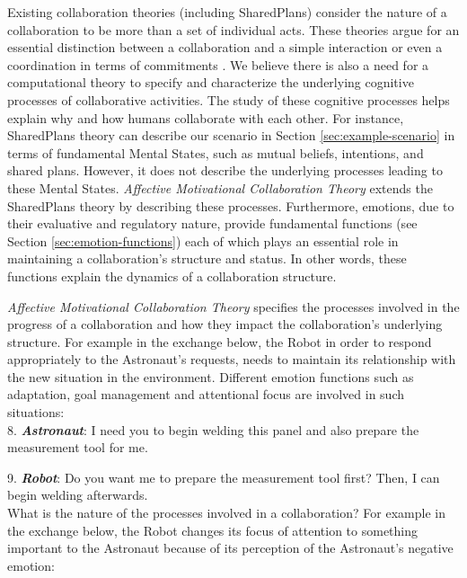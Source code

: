 \documentclass[12pt]{report}
\begin{document}
Existing collaboration theories (including SharedPlans) consider the nature of a
collaboration to be more than a set of individual acts. These theories argue for
an essential distinction between a collaboration and a simple interaction or
even a coordination in terms of commitments \cite{grosz:shared-plans,
lochbaum:collaborative-planning}. We believe there is also a need for a
computational theory to specify and characterize the underlying cognitive
processes of collaborative activities. The study of these cognitive processes
helps explain why and how humans collaborate with each other. For instance,
SharedPlans theory can describe our scenario in Section
\ref{sec:example-scenario} in terms of fundamental Mental States, such as mutual
beliefs, intentions, and shared plans. However, it does not describe the
underlying processes leading to these Mental States. \textit{Affective
Motivational Collaboration Theory} extends the SharedPlans theory by describing
these processes. Furthermore, emotions, due to their evaluative and regulatory
nature, provide fundamental functions (see Section \ref{sec:emotion-functions})
each of which plays an essential role in maintaining a collaboration's structure
and status. In other words, these functions explain the dynamics of a
collaboration structure.

\textit{Affective Motivational Collaboration Theory} specifies the processes
involved in the progress of a collaboration and how they impact the
collaboration's underlying structure. For example in the exchange below, the
Robot in order to respond appropriately to the Astronaut's requests, needs to
maintain its relationship with the new situation in the environment. Different
emotion functions such as adaptation, goal management and attentional focus are
involved in such situations:\\

  8. \textbf{\textit{Astronaut}}: I need you to begin welding this panel and also
  prepare the measurement tool for me.

  9. \textbf{\textit{Robot}}: Do you want me to prepare the measurement tool
  first? Then, I can begin welding afterwards.\\

What is the nature of the processes involved in a collaboration? For example in
the exchange below, the Robot changes its focus of attention to something
important to the Astronaut because of its perception of the Astronaut's negative
emotion:\\
\end{document}
